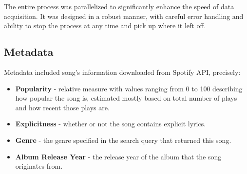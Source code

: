 The entire process was parallelized to significantly enhance the speed of data
acquisition. It was designed in a robust manner, with careful error handling
and ability to stop the process at any  time and pick up where it left off.




\subsection{Metadata}
\label{sec:metadata}
Metadata included song's information downloaded from Spotify API, precisely:

\begin{itemize}
  \item \textbf{Popularity} - relative measure with values ranging from 0 to
    100 describing how popular the song is, estimated mostly based on total
    number of plays and how recent  those plays are.
  \item \textbf{Explicitness} - whether or not the song contains explicit
    lyrics.
  \item \textbf{Genre} - the genre specified in the search query that returned
    this song.
  \item \textbf{Album Release Year} - the release year of the album that the
    song originates from.
\end{itemize}



